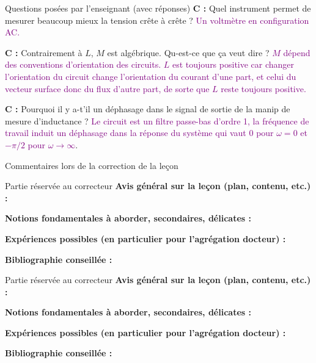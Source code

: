 \begin{reportBlock}{Questions posées par l’enseignant (avec réponses)}
  \textbf{C :} Quel instrument permet de mesurer beaucoup mieux la tension crête à crête ? \textcolor{purple}{Un voltmètre en configuration AC.}\newline
  
  \textbf{C :} Contrairement à $L$, $M$ est algébrique. Qu-est-ce que ça veut dire ? \textcolor{purple}{$M$ dépend des conventions d'orientation des circuits. $L$ est toujours positive car changer l'orientation du circuit change l'orientation du courant d'une part, et celui du vecteur surface donc du flux d'autre part, de sorte que $L$ reste toujours positive.}\newline
  
  \textbf{C :} Pourquoi il y a-t'il un déphasage dans le signal de sortie de la manip de mesure d'inductance ? \textcolor{purple}{Le circuit est un filtre passe-bas d'ordre 1, la fréquence de travail induit un déphasage dans la réponse du système qui vaut $0$ pour $\omega=0$ et $-\pi/2$ pour $\omega\rightarrow\infty$}.
  
  
\end{reportBlock}


\begin{reportBlock}{Commentaires lors de la correction de la leçon}
\end{reportBlock}


\begin{reportBlock}{Partie réservée au correcteur}
  \textbf{Avis général sur la leçon (plan, contenu, etc.) :}
  
  
  \textbf{Notions fondamentales à aborder, secondaires, délicates :}
  
  
  \textbf{Expériences possibles (en particulier pour l'agrégation docteur) :}
  
  
  \textbf{Bibliographie conseillée :}
\end{reportBlock}


\begin{reportBlock}{Partie réservée au correcteur}
  \textbf{Avis général sur la leçon (plan, contenu, etc.) :}
  
  
  \textbf{Notions fondamentales à aborder, secondaires, délicates :}
  
  
  \textbf{Expériences possibles (en particulier pour l'agrégation docteur) :}
  
  
  \textbf{Bibliographie conseillée :}
\end{reportBlock}
